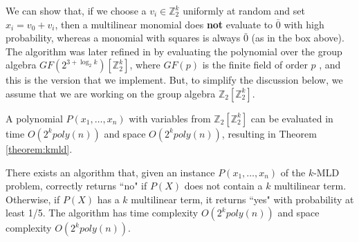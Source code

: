 
We can show that, if we choose a $v_i \in \mathbb{Z}_2^k$ uniformly at random and set $x_i = v_0 + v_i$, then a multilinear monomial does \textbf{not} evaluate to $\bar 0$ with high probability, whereas a monomial with squares is always $\bar 0$ (as in the box above).
The algorithm was later refined in \cite{williams2009finding} by evaluating the polynomial over the group algebra $GF(2^{3 + \log_2k})[\mathbb{Z}_2^k]$, where $GF(p)$ is the finite field of order $p$ \cite{mullen2007finite}, and this is the version that we implement. But, to simplify the discussion below, we assume that we are working on the group algebra $\mathbb{Z}_2[\mathbb{Z}_2^k]$. 

A polynomial $P(x_1,\ldots,x_n)$ with variables from $\mathbb{Z}_2[\mathbb{Z}_2^k]$ can be evaluated in time $O(2^k poly(n))$ and space $O(2^kpoly(n))$, resulting in Theorem \ref{theorem:kmld}.

\begin{theorem}
\label{theorem:kmld}
There exists an algorithm that, given an instance $P(x_1,\ldots,x_n)$ of the \textsc{$k$-MLD} problem, correctly returns ``no" if $P(X)$ does not contain a $k$ multilinear term. Otherwise, if $P(X)$ has a $k$ multilinear term, it returns ``yes" with probability at least 1/5. 
The algorithm has time complexity $O(2^k poly(n))$ and space complexity $O(2^k poly(n))$.
\end{theorem}


